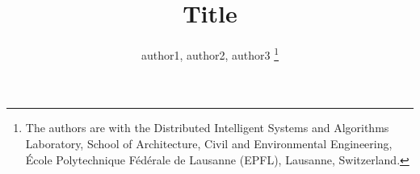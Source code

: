 \documentclass[journal]{IEEEtran}
\begin{document}

%
\title{Title}

%


\author{author1, author2, author3
\thanks{The authors are with the Distributed Intelligent Systems and Algorithms Laboratory, School of Architecture, Civil and Environmental Engineering, \'{E}cole Polytechnique F\'{e}d\'{e}rale de Lausanne (EPFL), Lausanne, Switzerland. 
}
}



\maketitle

\begin{abstract}


\end{abstract}









  

\end{document}
